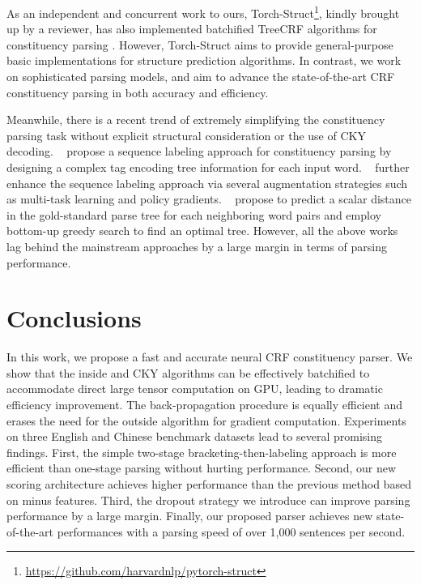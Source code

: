 \documentclass{article}
\begin{document}
\begin{table}[tb]
\begin{table}[tb]
As an independent and concurrent work to ours, Torch-Struct\footnote{\url{https://github.com/harvardnlp/pytorch-struct}}, kindly brought up by a reviewer, has also implemented batchified TreeCRF algorithms for constituency parsing \cite{alex-2020-torchstruct}.
However, Torch-Struct aims to provide general-purpose basic implementations for structure prediction algorithms.
In contrast, we work on sophisticated parsing models, and aim to advance the state-of-the-art CRF constituency parsing in both accuracy and efficiency.


















Meanwhile, there is a recent trend of extremely simplifying the constituency parsing task without explicit structural consideration or the use of CKY decoding.
\citeauthor{gomez-rodriguez-vilares-2018-constituent}~ propose a sequence labeling approach for constituency parsing by designing a complex tag encoding tree information for each input word.
\citeauthor{vilares-etal-2019-better}~ further enhance the sequence labeling approach via several augmentation strategies such as multi-task learning and policy gradients.
\citeauthor{shen-etal-2018-straight}~ propose to predict a scalar distance in the gold-standard parse tree for each neighboring word pairs and employ bottom-up greedy search to find an optimal tree.
However, all the above works lag behind the mainstream approaches by a large margin in terms of parsing performance.










 \section{Conclusions}
\label{section:conclusions}

In this work, we propose a fast and accurate neural CRF constituency parser. We show that the inside and CKY algorithms can be effectively batchified to accommodate direct large tensor computation on GPU, leading to dramatic efficiency improvement.
The back-propagation procedure is equally efficient and erases the need for the outside algorithm for gradient computation.
Experiments on three English and Chinese benchmark datasets lead to several promising findings.
First, the simple two-stage bracketing-then-labeling approach is more efficient than one-stage parsing without hurting performance.
Second, our new scoring architecture achieves higher performance than the previous method based on minus features.
Third, the dropout strategy we introduce can improve parsing performance by a large margin.
Finally, our proposed parser achieves new state-of-the-art performances with a parsing speed of over 1,000 sentences per second.


\end{table}
\end{table}
\end{document}
